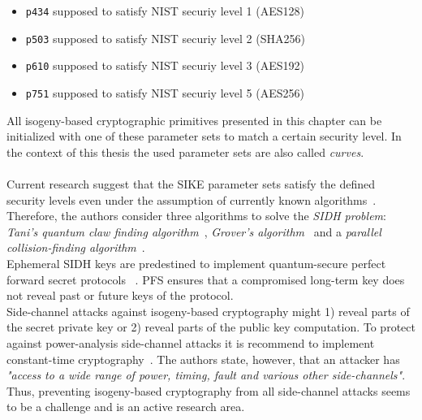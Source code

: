 \begin{itemize}
\itemsep0em 
	\item \texttt{p434} supposed to satisfy \gls{NIST} securiy level 1 (AES128)
	\item \texttt{p503} supposed to satisfy \gls{NIST} securiy level 2 (SHA256)
	\item \texttt{p610} supposed to satisfy \gls{NIST} securiy level 3 (AES192)
	\item \texttt{p751} supposed to satisfy \gls{NIST} securiy level 5 (AES256)
\end{itemize}
All isogeny-based cryptographic primitives presented in this chapter can be initialized with one of these parameter sets to match a certain security level. In the context of this thesis the used parameter sets are also called \textit{curves}.
\\\\
Current research suggest that the \gls{SIKE} parameter sets satisfy the defined security levels even under the assumption of currently known algorithms~\parencite{jaques2019quantum}. Therefore, the authors consider three algorithms to solve the \textit{\gls{SIDH} problem}: \textit{Tani's quantum claw finding algorithm}~\parencite{tani2009claw}, \textit{Grover's algorithm}~\parencite{grover1996fast} and a \textit{parallel collision-finding algorithm}~\parencite{van1999parallel}.
\\
Ephemeral \gls{SIDH} keys are predestined to implement quantum-secure perfect forward secret protocols ~\parencite{koziel2018high}. \gls{PFS} ensures that a compromised long-term key does not reveal past or future keys of the protocol.
\\
Side-channel attacks against isogeny-based cryptography might 1) reveal parts of the secret private key or 2) reveal parts of the public key computation. To protect against power-analysis side-channel attacks it is recommend to implement constant-time cryptography~\parencite{sike2020spec}. The authors state, however, that an attacker has \textit{"access to a wide range of power, timing, fault and various other side-channels"}. Thus, preventing isogeny-based cryptography from all side-channel attacks seems to be a challenge and is an active research area.
